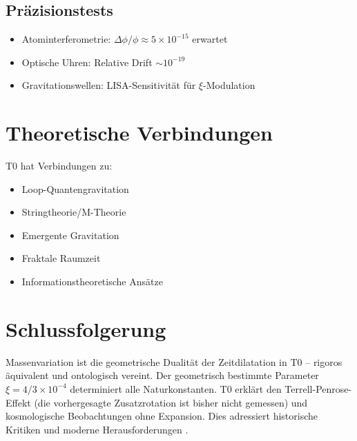	\subsection{Präzisionstests}
	\begin{itemize}
		\item Atominterferometrie: $\Delta\phi/\phi \approx 5 \times 10^{-15}$ erwartet \cite{kasevich2023}
		\item Optische Uhren: Relative Drift $\sim 10^{-19}$ \cite{ludlow2015, brewer2019}
		\item Gravitationswellen: LISA-Sensitivität für $\xi$-Modulation \cite{lisa2017}
	\end{itemize}
	
	\section{Theoretische Verbindungen}
	
	T0 hat Verbindungen zu:
	\begin{itemize}
		\item Loop-Quantengravitation \cite{rovelli2004, ashtekar2004}
		\item Stringtheorie/M-Theorie \cite{polchinski1998, becker2007}
		\item Emergente Gravitation \cite{verlinde2011, jacobson1995}
		\item Fraktale Raumzeit \cite{nottale1993, elnaschie2004}
		\item Informationstheoretische Ansätze \cite{susskind1995, maldacena1998}
	\end{itemize}
	
	\section{Schlussfolgerung}
	
	Massenvariation ist die geometrische Dualität der Zeitdilatation in T0 – rigoros äquivalent und ontologisch vereint. Der geometrisch bestimmte Parameter $\xi = 4/3 \times 10^{-4}$ determiniert alle Naturkonstanten. T0 erklärt den Terrell-Penrose-Effekt (die vorhergesagte Zusatzrotation ist bisher nicht gemessen) und kosmologische Beobachtungen ohne Expansion. Dies adressiert historische Kritiken \cite{hundert1931, dingle1972} und moderne Herausforderungen \cite{riess2022, divalentino2021}. 
	

